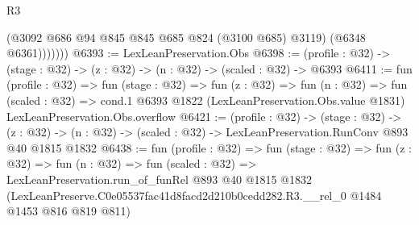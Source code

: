 \begin{lexlean}{R3}
\begin{coremodule}
                (@3092 @686 @94 @845 @845 @685 @824 (@3100 @685) @3119)
                (@6348 @6361)))))))
@6393 := LexLeanPreservation.Obs
@6398 := (profile : @32) -> (stage : @32) -> (z : @32) -> (n : @32) -> (scaled : @32) -> @6393
@6411 := fun (profile : @32) =>
  fun (stage : @32) =>
  fun (z : @32) =>
  fun (n : @32) =>
  fun (scaled : @32) =>
  cond.{1} @6393 @1822 (LexLeanPreservation.Obs.value @1831) LexLeanPreservation.Obs.overflow
@6421 := (profile : @32) ->
  (stage : @32) ->
  (z : @32) -> (n : @32) -> (scaled : @32) -> LexLeanPreservation.RunConv @893 @40 @1815 @1832
@6438 := fun (profile : @32) =>
  fun (stage : @32) =>
  fun (z : @32) =>
  fun (n : @32) =>
  fun (scaled : @32) =>
  LexLeanPreservation.run_of_funRel
    @893
    @40
    @1815
    @1832
    (LexLeanPreserve.C0e05537fac41d8facd2d210b0cedd282.R3.__rel_0 @1484 @1453 @816 @819 @811)
\end{coremodule}
\end{lexlean}
